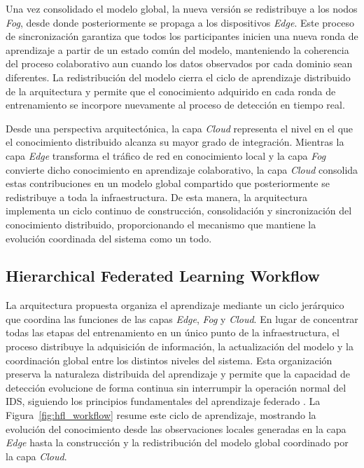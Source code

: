 \documentclass[journal,article,submit,moreauthors]{Definitions/mdpi}
\begin{document}
Una vez consolidado el modelo global, la nueva versión se redistribuye a los nodos \textit{Fog}, desde donde posteriormente se propaga a los dispositivos \textit{Edge}. Este proceso de sincronización garantiza que todos los participantes inicien una nueva ronda de aprendizaje a partir de un estado común del modelo, manteniendo la coherencia del proceso colaborativo aun cuando los datos observados por cada dominio sean diferentes. La redistribución del modelo cierra el ciclo de aprendizaje distribuido de la arquitectura y permite que el conocimiento adquirido en cada ronda de entrenamiento se incorpore nuevamente al proceso de detección en tiempo real.

Desde una perspectiva arquitectónica, la capa \textit{Cloud} representa el nivel en el que el conocimiento distribuido alcanza su mayor grado de integración. Mientras la capa \textit{Edge} transforma el tráfico de red en conocimiento local y la capa \textit{Fog} convierte dicho conocimiento en aprendizaje colaborativo, la capa \textit{Cloud} consolida estas contribuciones en un modelo global compartido que posteriormente se redistribuye a toda la infraestructura. De esta manera, la arquitectura implementa un ciclo continuo de construcción, consolidación y sincronización del conocimiento distribuido, proporcionando el mecanismo que mantiene la evolución coordinada del sistema como un todo.

\subsection{Hierarchical Federated Learning Workflow}

La arquitectura propuesta organiza el aprendizaje mediante un ciclo jerárquico que coordina las funciones de las capas \textit{Edge}, \textit{Fog} y \textit{Cloud}. En lugar de concentrar todas las etapas del entrenamiento en un único punto de la infraestructura, el proceso distribuye la adquisición de información, la actualización del modelo y la coordinación global entre los distintos niveles del sistema. Esta organización preserva la naturaleza distribuida del aprendizaje y permite que la capacidad de detección evolucione de forma continua sin interrumpir la operación normal del IDS, siguiendo los principios fundamentales del aprendizaje federado \cite{McMahan2017,Imteaj2022,Ramadan2025,Cooray2025}. La Figura~\ref{fig:hfl_workflow} resume este ciclo de aprendizaje, mostrando la evolución del conocimiento desde las observaciones locales generadas en la capa \textit{Edge} hasta la construcción y la redistribución del modelo global coordinado por la capa \textit{Cloud}.
\end{document}
